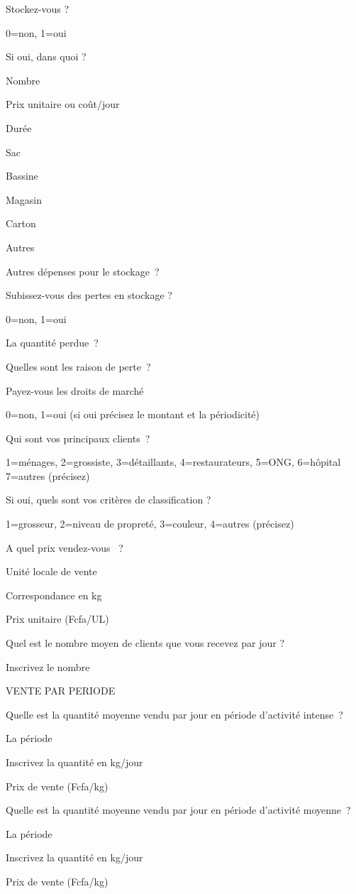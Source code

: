 \documentclass[12pt,oneside]{report}
\begin{document}
Stockez-vous ?

0=non, 1=oui

Si oui, dans quoi ?

Nombre

Prix unitaire ou coût/jour

Durée

Sac

Bassine

Magasin

Carton

Autres

Autres dépenses pour le stockage ?

Subissez-vous des pertes en stockage ?

0=non, 1=oui

La quantité perdue ?

Quelles sont les raison de perte ?

Payez-vous les droits de marché

0=non, 1=oui (si oui précisez le montant et la périodicité)

Qui sont vos principaux clients ?

1=ménages, 2=grossiste, 3=détaillants, 4=restaurateurs, 5=ONG, 6=hôpital 7=autres (précisez)

Si oui, quels sont vos critères de classification ?

1=grosseur, 2=niveau de propreté, 3=couleur, 4=autres (précisez)

A quel prix vendez-vous  ?

Unité locale de vente

Correspondance en kg

Prix unitaire (Fcfa/UL)

Quel est le nombre moyen de clients que vous recevez par jour ?

Inscrivez le nombre

VENTE PAR PERIODE

Quelle est la quantité moyenne vendu par jour en période d’activité intense ?

La période

Inscrivez la quantité en kg/jour

Prix de vente (Fcfa/kg)

Quelle est la quantité moyenne vendu par jour en période d’activité moyenne ?

La période

Inscrivez la quantité en kg/jour

Prix de vente (Fcfa/kg)
\end{document}
